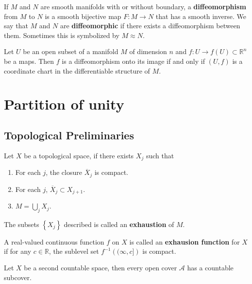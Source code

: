 \documentclass[12pt, oneside]{book}
\begin{document}
\begin{definition}
    If $M$ and $N$ are smooth manifolds with or without boundary, a \textbf{diffeomorphism} from $M$ to $N$ is a smooth bijective map $F: M \rightarrow N$ that has a smooth inverse. We say that $M$ and $N$ are \textbf{diffeomorphic} if there exists a diffeomorphism between them. Sometimes this is symbolized by $M \approx N$.
\end{definition}
\begin{proposition}
    Let $U$ be an open subset of a manifold $M$ of dimension $n$ and $f: U \rightarrow f(U) \subset \mathbb{R}^n$ be a maps.
    Then $f$ is a diffeomorphism onto its image if and only if $(U, f)$ is a coordinate chart in the differentiable structure of $M$.
\end{proposition}



\section{Partition of unity}

\subsection{Topological Preliminaries}

\begin{definition}
    Let $X$ be a topological space, if there exists $X_j$ such that
    \begin{enumerate}[label=(\roman*)]
        \item For each $j$, the closure $\overline{X}_j$ is compact.

        \item For each $j$, $ \overline{X}_j \subset X_{j+1}$.

        \item  $M=\bigcup_j X_j$.
    \end{enumerate}
    The subsets $ \left\{X_j\right\}$ described is called an \textbf{exhaustion} of $M$.
\end{definition}



\begin{definition}
    A real-valued continuous function $f$ on $X$ is called an \textbf{exhausion function} for $X$ if for any $c \in \mathbb{R}$, the sublevel set $f^{-1}\left((\infty, c]\right)$ is compact.
\end{definition}

\begin{lemma}[Lindelof's]
    Let $X$ be a second countable space, then every open cover $\mathcal{A}$ has a countable subcover.
\end{lemma}
\end{document}
